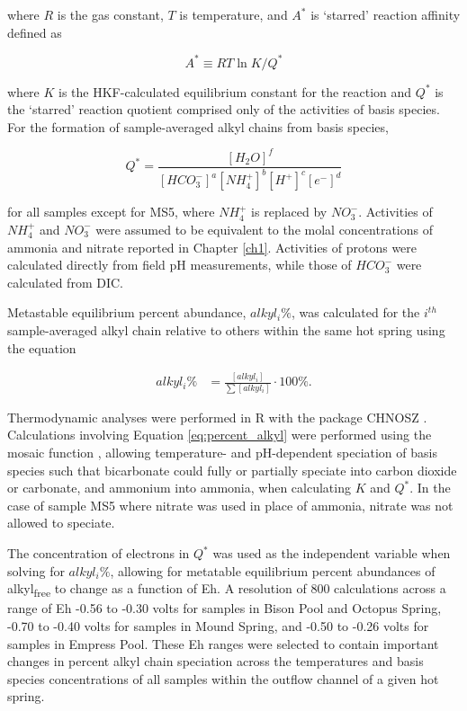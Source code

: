 \noindent where $R$ is the gas constant, $T$ is temperature, and $A^{*}$ is `starred' reaction affinity defined as

\begin{equation}
A^{*} \equiv RT\ln{K/Q^{*}}
\end{equation}

\noindent where $K$ is the HKF-calculated equilibrium constant for the reaction and $Q^{*}$ is the `starred' reaction quotient comprised only of the activities of basis species. For the formation of sample-averaged alkyl chains from basis species,

\begin{equation}
Q^{*} = \frac{[H_{2}O]^{f}}{[HCO_{3}^{-}]^{a}[NH_{4}^{+}]^{b}[H^{+}]^{c}[e^{-}]^{d}}
\end{equation}

\noindent for all samples except for MS5, where $NH_{4}^{+}$ is replaced by $NO_{3}^{-}$. Activities of $NH_{4}^{+}$ and $NO_{3}^{-}$ were assumed to be equivalent to the molal concentrations of ammonia and nitrate reported in Chapter \ref{ch1}. Activities of protons were calculated directly from field pH measurements, while those of $HCO_{3}^{-}$ were calculated from DIC.

Metastable equilibrium percent abundance, $alkyl_{i}\%$, was calculated for the $i^{th}$ sample-averaged alkyl chain relative to others within the same hot spring using the equation

\begin{equation} \label{eq:percent_alkyl}
\begin{split}
alkyl_{i}\% & = \frac{[alkyl_{i}]}{\sum{[alkyl_{i}]}} \cdot 100\%.
\end{split}
\end{equation}

Thermodynamic analyses were performed in R with the package CHNOSZ \citep{dick2008calculation}. Calculations involving Equation \ref{eq:percent_alkyl} were performed using the mosaic function \citep{dick2017equilibrium}, allowing temperature- and pH-dependent speciation of basis species such that bicarbonate could fully or partially speciate into carbon dioxide or carbonate, and ammonium into ammonia, when calculating $K$ and $Q^{*}$. In the case of sample MS5 where nitrate was used in place of ammonia, nitrate was not allowed to speciate.

The concentration of electrons in $Q^{*}$ was used as the independent variable when solving for $alkyl_{i}\%$, allowing for metatable equilibrium percent abundances of alkyl\textsubscript{free} to change as a function of Eh. A resolution of 800 calculations across a range of Eh -0.56 to -0.30 volts for samples in Bison Pool and Octopus Spring, -0.70 to -0.40 volts for samples in Mound Spring, and -0.50 to -0.26 volts for samples in Empress Pool. These Eh ranges were selected to contain important changes in percent alkyl chain speciation across the temperatures and basis species concentrations of all samples within the outflow channel of a given hot spring.

